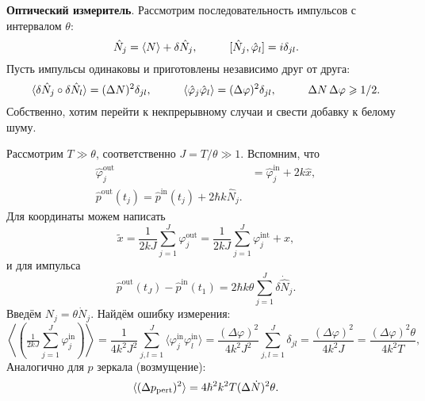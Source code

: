 \textbf{Оптический измеритель}. Рассмотрим последовательность импульсов с интервалом $\theta$:
\begin{equation*}
	\hat{N}_j = \langle N\rangle + \delta \hat{N}_j,
	\hspace{10 mm} 
 	[\hat{N}_j, \hat{\varphi}_l] = i \delta_{jl}.
\end{equation*}
Пусть импульсы одинаковы и приготовлены независимо друг от друга:
\begin{equation*}
	\langle  \delta \hat{N}_j \circ \delta \hat{N}_l\rangle = (\Delta N)^2 \delta_{jl},
	\hspace{10 mm} 
	\langle \hat{\varphi}_j \hat{\varphi}_l\rangle = (\Delta \varphi)^2 \delta_{jl},
	\hspace{10 mm} 
	\Delta N \, \Delta \varphi \geq 1/2.
\end{equation*}
Собственно, хотим перейти к некпрерывному случаи и свести добавку к белому шуму. 


Рассмотрим $T \gg \theta$, соответственно $J = T/\theta \gg 1$. Вспомним, что
\begin{align*}
	\hat{\varphi}_j^{\text{out}} &=  \hat{\varphi}_j^{\text{in}} + 2 k \hat{x}, \\
	\hat{p}^{\text{out}} (t_j) = \hat{p}^{\text{in}} (t_j) + 2 \hbar k \hat{N}_j.
\end{align*}
Для координаты можем написать
\begin{equation*}
	\tilde{x} = \frac{1}{2k J} \sum_{j=1}^J \varphi_j^{\text{out}} = \frac{1}{2kJ} \sum_{j=1}^{J}  \varphi_j^{\text{int}} + x,
\end{equation*}
и для импульса
\begin{equation*}
	\hat{p}^{\text{out}}(t_J)-\hat{p}^{\text{in}}(t_1) = 2 \hbar k \theta \sum_{j=1}^{J} \delta \dot{\hat{N}}_j.
\end{equation*}
Введём $N_j = \theta \dot{N}_j$. Найдём ошибку измерения:
\begin{equation*}
	\left\langle \left(
		\tfrac{1}{2kJ} \textstyle \sum_{j=1}^{J} \varphi_j^{\text{in}}
	\right)\right\rangle = \frac{1}{4 k^2 J^2} \sum_{j,l=1}^{J} \langle \varphi_j^{\text{in}} \varphi_l^{\text{in}} \rangle
	= \frac{(\Delta \varphi)^2}{4 k^2 J^2} \sum_{j,l=1}^{J} \delta_{jl} = \frac{(\Delta \varphi)^2}{4 k^2 J} = \frac{(\Delta \varphi)^2 \theta}{4 k^2 T},
\end{equation*}
Аналогично для $p$ зеркала (возмущение):
\begin{equation*}
	\langle (\Delta p_{\textnormal{pert}})^2\rangle = 4 \hbar^2 k^2 T (\Delta \dot{N})^2 \theta.
\end{equation*}











